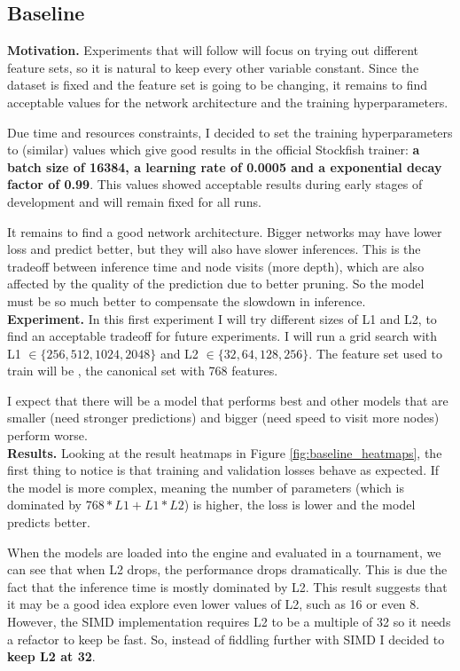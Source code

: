 \subsection{Baseline}

\textbf{Motivation.} Experiments that will follow will focus on trying out different feature sets, so it is natural to keep every other variable constant. Since the dataset is fixed and the feature set is going to be changing, it remains to find acceptable values for the network architecture and the training hyperparameters. 

Due time and resources constraints, I decided to set the training hyperparameters to   (similar) values which give good results in the official Stockfish trainer: \textbf{a batch size of 16384, a learning rate of 0.0005 and a exponential decay factor of 0.99}. This values showed acceptable results during early stages of development and will remain fixed for all runs.

It remains to find a good network architecture. Bigger networks may have lower loss and predict better, but they will also have slower inferences. This is the tradeoff between inference time and node visits (more depth), which are also affected by the quality of the prediction due to better pruning. So the model must be so much better to compensate the slowdown in inference. \\

\textbf{Experiment.}  In this first experiment I will try different sizes of L1 and L2,  to find an acceptable tradeoff for future experiments. I will run a grid search with L1 $\in \{256, 512, 1024, 2048\}$ and L2 $\in \{32, 64, 128, 256\}$. The feature set used to train will be , the canonical set with 768 features.

I expect that there will be a model that performs best and other models that are smaller (need stronger predictions) and bigger (need speed to visit more nodes) perform worse. \\

\textbf{Results.} Looking at the result heatmaps in Figure \ref{fig:baseline_heatmaps}, the first thing to notice is that training and validation losses behave as expected. If the model is more complex, meaning the number of parameters (which is dominated by $768*L1+L1*L2$) is higher, the loss is lower and the model predicts better.

When the models are loaded into the engine and evaluated in a tournament, we can see that when L2 drops, the performance drops dramatically. This is due the fact that the inference time is mostly dominated by L2. This result suggests that it may be a good idea explore even lower values of L2, such as 16 or even 8. However, the SIMD implementation requires L2 to be a multiple of 32 so it needs a refactor to keep be fast. So, instead of fiddling further with SIMD I decided to \textbf{keep L2 at 32}.

